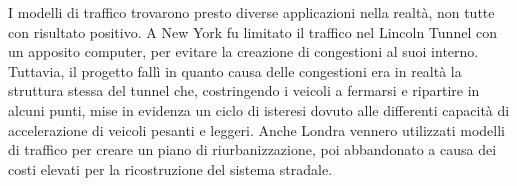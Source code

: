 \documentclass[../main.tex]{subfiles}
\begin{document}
I modelli di traffico trovarono presto diverse applicazioni nella realt\`a, non tutte con risultato positivo.
A New York fu limitato il traffico nel Lincoln Tunnel con un apposito computer, per evitare la creazione di congestioni al suoi interno.
Tuttavia, il progetto fall\`i in quanto causa delle congestioni era in realt\`a la struttura stessa del tunnel che, costringendo i veicoli a fermarsi e ripartire in alcuni punti, mise in evidenza un ciclo di isteresi dovuto alle differenti capacit\`a di accelerazione di veicoli pesanti e leggeri.
Anche Londra vennero utilizzati modelli di traffico per creare un piano di riurbanizzazione, poi abbandonato a causa dei costi elevati per la ricostruzione del sistema stradale.
\end{document}
